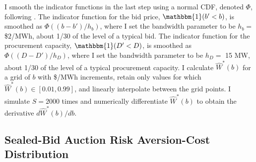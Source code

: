 \documentclass[12pt]{article}
\theoremstyle{definition} %
\newcommand{\I}{\mathbbm{1}}
\begin{document}
I smooth the indicator functions in the last step using a normal CDF, denoted $\Phi $, following \citet{Ryan2026}. The indicator function for the bid price, $\I(b' < b) $, is smoothed as $\Phi((b-b')/h_b) $, where I set the bandwidth parameter to be $h_b = $ \$$2$/MWh, about 1/30 of the level of a typical bid. The indicator function for the procurement capacity, $\I(D' < D) $, is smoothed as $\Phi((D-D')/h_D) $, where I set the bandwidth parameter to be $h_D = $ 15 MW, about 1/30 of the level of a typical procurement capacity. I calculate $\hat{W}^\ast(b)$ for a grid of $b$ with \$/MWh increments, retain only values for which $\hat{W}^\ast(b) \in [0.01,0.99]$, and linearly interpolate between the grid points. I simulate $S = 2000 $ times and numerically differentiate $\hat{W}^\ast(b) $ to obtain the derivative $d\hat{W}^\ast(b)/db $.


\subsection{Sealed-Bid Auction Risk Aversion-Cost Distribution}
\label{sec:gammacostsimulation}
\end{document}
